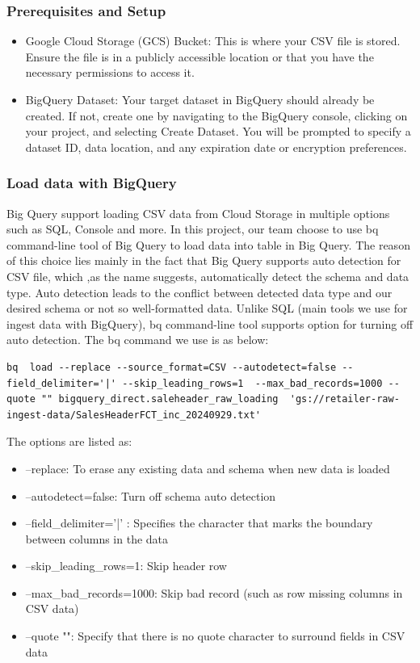 \subsubsection{Prerequisites and Setup}
\begin{itemize}
    \item Google Cloud Storage (GCS) Bucket: This is where your CSV file is stored. Ensure the file is in a publicly accessible location or that you have the necessary permissions to access it.
\item BigQuery Dataset: Your target dataset in BigQuery should already be created. If not, create one by navigating to the BigQuery console, clicking on your project, and selecting Create Dataset. You will be prompted to specify a dataset ID, data location, and any expiration date or encryption preferences.
\end{itemize}
\subsubsection{Load data with BigQuery}
Big Query support loading CSV data from Cloud Storage in multiple options such as SQL, Console and more. In this project, our team choose to use bq command-line tool of Big Query to load data into table in Big Query. The reason of this choice lies mainly in the fact that Big Query supports auto detection for CSV file, which ,as the name suggests, automatically detect the schema and data type. Auto detection leads to the conflict between detected data type and our desired schema or not so well-formatted data. Unlike SQL (main tools we use for ingest data with BigQuery), bq command-line tool supports option for turning off auto detection. The bq command we use is as below:
\begin{lstlisting}
bq  load --replace --source_format=CSV --autodetect=false --field_delimiter='|' --skip_leading_rows=1  --max_bad_records=1000 --quote "" bigquery_direct.saleheader_raw_loading  'gs://retailer-raw-ingest-data/SalesHeaderFCT_inc_20240929.txt' 
\end{lstlisting}
The options are listed as:
\begin{itemize}
    \item --replace: To erase any existing data and schema when new data is loaded
    \item --autodetect=false: Turn off schema auto detection
    \item --field\_delimiter='|' : Specifies the character that marks the boundary between columns in the data
    \item  --skip\_leading\_rows=1: Skip header row
    \item --max\_bad\_records=1000: Skip bad record (such as row missing columns in CSV data)
    \item --quote "": Specify that there is no quote character to surround fields in CSV data
\end{itemize}
